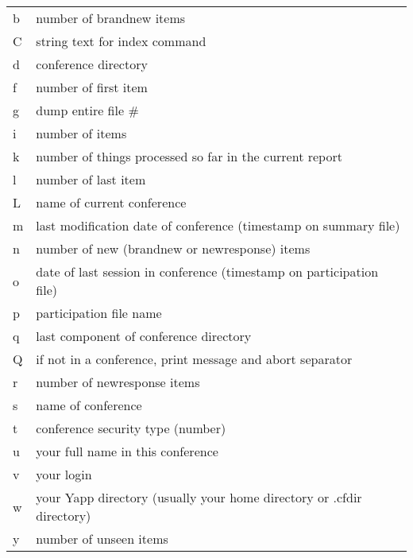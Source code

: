\documentclass[twoside]{report}
\begin{document}
         \tablelasttail{\hline}
         \begin{supertabular}{ll}

            b     &number of brandnew items \\
            C     &string text for index command \\
            d     &conference directory \\
            f     &number of first item \\
            g     &dump entire file \# \\
            i     &number of items \\
            k     &number of things processed so far in the current report \\
            l     &number of last item \\
            L     &name of current conference \\
            m     &last modification date of conference (timestamp on 
                   summary file) \\
            n     &number of new (brandnew or newresponse) items \\
            o     &date of last session in conference (timestamp on 
                   participation file) \\
            p     &participation file name \\
            q     &last component of conference directory \\
            Q     &if not in a conference, print message and abort separator \\
            r     &number of newresponse items \\
            s     &name of conference \\
            t     &conference security type (number) \\
            u     &your full name in this conference \\
            v     &your login \\
            w     &your Yapp directory (usually your home directory or 
                   .cfdir directory) \\
            y     &number of unseen items                  \\
         \end{supertabular} 
\end{document}
